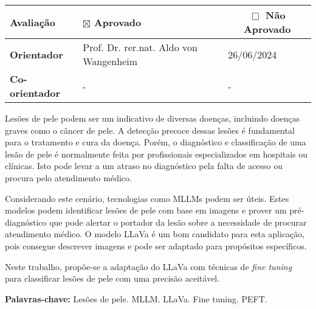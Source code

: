 \begin{folhadeaprovacao}
	\vspace{-4pt}

	\tiny
	\noindent \begin{tabularx}{\textwidth}{| l | X | l | l |}
		\hline
		{\textbf{Avaliação}}     & \multicolumn{1}{l}{\textbf{$\boxtimes$ Aprovado}} & \multicolumn{2}{c|}{\textbf{$\Box$ Não Aprovado}}   \\ \hline
		{\textbf{Orientador}}    & {Prof. Dr. rer.nat. Aldo von Wangenheim}          & {26/06/2024}                                      & \\ \hline
		{\textbf{Co-orientador}} & {-}                                               & {-}                                               & \\ \hline
	\end{tabularx}
\end{folhadeaprovacao}

\setlength{\absparsep}{18pt}
\begin{resumo}
	\SingleSpacing

	Lesões de pele podem ser um indicativo de diversas doenças, incluindo doenças graves como o câncer de pele. A detecção precoce dessas lesões é fundamental para o
	tratamento e cura da doença. Porém, o diagnóstico e classificação de uma lesão de pele é normalmente feita por profissionais especializados em hospitais ou clínicas.
	Isto pode levar a um atraso no diagnóstico pela falta de acesso ou procura pelo atendimento médico.

	Considerando este cenário, tecnologias como \ac{MLLMs} podem ser úteis. Estes modelos podem identificar lesões de pele com base em imagens e prover um pré-diagnóstico
	que pode alertar o portador da lesão sobre a necessidade de procurar atendimento médico. O modelo \ac{LLaVa} é um bom candidato para esta aplicação, pois consegue
	descrever imagens e pode ser adaptado para propósitos específicos.

	Neste trabalho, propõe-se a adaptação do \ac{LLaVa} com técnicas de \textit{fine tuning} para classificar lesões de pele com uma precisão aceitável.

	\textbf{Palavras-chave:} Lesões de pele. MLLM. LLaVa. Fine tuning. PEFT.
\end{resumo}



{
\hypersetup{hidelinks}

\imprimirlistadesiglas

\tableofcontents*
\cleardoublepage
}
